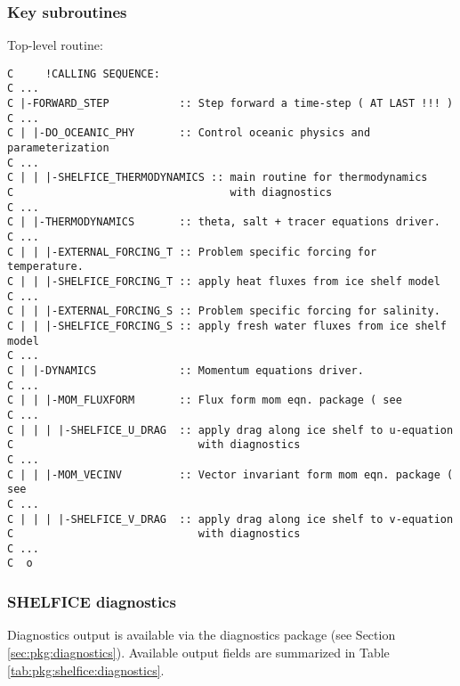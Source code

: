 
\subsubsection{Key subroutines
\label{sec:pkg:shelfice:subroutines}}

Top-level routine: 

{\footnotesize
\begin{verbatim}
C     !CALLING SEQUENCE:
C ...
C |-FORWARD_STEP           :: Step forward a time-step ( AT LAST !!! )
C ...
C | |-DO_OCEANIC_PHY       :: Control oceanic physics and parameterization
C ...
C | | |-SHELFICE_THERMODYNAMICS :: main routine for thermodynamics
C                                  with diagnostics
C ...
C | |-THERMODYNAMICS       :: theta, salt + tracer equations driver.
C ...
C | | |-EXTERNAL_FORCING_T :: Problem specific forcing for temperature.
C | | |-SHELFICE_FORCING_T :: apply heat fluxes from ice shelf model
C ...
C | | |-EXTERNAL_FORCING_S :: Problem specific forcing for salinity.
C | | |-SHELFICE_FORCING_S :: apply fresh water fluxes from ice shelf model
C ...
C | |-DYNAMICS             :: Momentum equations driver.
C ...
C | | |-MOM_FLUXFORM       :: Flux form mom eqn. package ( see
C ...
C | | | |-SHELFICE_U_DRAG  :: apply drag along ice shelf to u-equation
C                             with diagnostics
C ...
C | | |-MOM_VECINV         :: Vector invariant form mom eqn. package ( see
C ...
C | | | |-SHELFICE_V_DRAG  :: apply drag along ice shelf to v-equation
C                             with diagnostics
C ...
C  o
\end{verbatim}
}



\subsubsection{SHELFICE diagnostics
\label{sec:pkg:shelfice:diagnostics}}

Diagnostics output is available via the diagnostics package
(see Section \ref{sec:pkg:diagnostics}).
Available output fields are summarized in 
Table \ref{tab:pkg:shelfice:diagnostics}.

